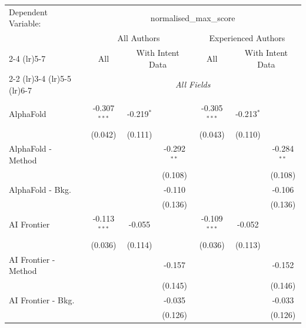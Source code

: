\begingroup
\centering
\begin{tabular}{lcccccc}
   \tabularnewline \midrule \midrule
   Dependent Variable: & \multicolumn{6}{c}{normalised\_max\_score}\\
 & \multicolumn{3}{c}{All Authors} & \multicolumn{3}{c}{Experienced Authors} \\
\cmidrule(lr){2-4} \cmidrule(lr){5-7}
 & \multicolumn{1}{c}{All} & \multicolumn{2}{c}{With Intent Data} & \multicolumn{1}{c}{All} & \multicolumn{2}{c}{With Intent Data} \\
\cmidrule(lr){2-2} \cmidrule(lr){3-4} \cmidrule(lr){5-5} \cmidrule(lr){6-7}
 & \multicolumn{6}{c}{\textit{All Fields}} \\ \\
   AlphaFold            & -0.307$^{***}$ & -0.219$^{*}$ &               & -0.305$^{***}$ & -0.213$^{*}$ &   \\   
                        & (0.042)        & (0.111)      &               & (0.043)        & (0.110)      &   \\   
   AlphaFold - Method   &                &              & -0.292$^{**}$ &                &              & -0.284$^{**}$\\   
                        &                &              & (0.108)       &                &              & (0.108)\\   
   AlphaFold - Bkg.     &                &              & -0.110        &                &              & -0.106\\   
                        &                &              & (0.136)       &                &              & (0.136)\\   
   AI Frontier          & -0.113$^{***}$ & -0.055       &               & -0.109$^{***}$ & -0.052       &   \\   
                        & (0.036)        & (0.114)      &               & (0.036)        & (0.113)      &   \\   
   AI Frontier - Method &                &              & -0.157        &                &              & -0.152\\   
                        &                &              & (0.145)       &                &              & (0.146)\\   
   AI Frontier - Bkg.   &                &              & -0.035        &                &              & -0.033\\   
                        &                &              & (0.126)       &                &              & (0.126)\\   

\end{tabular}
